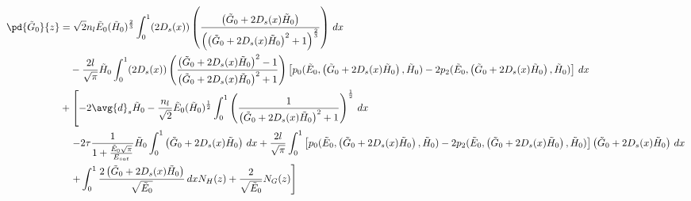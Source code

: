 \begin{equation}
\begin{split}
\pd{\tilde{G}_0}{z} &= \sqrt{2}n_{l}\tilde{E}_0 (\tilde{H}_0)^{\frac{2}{3}}  \int_{0}^{1} (2 D_s(x)) \left(\frac{\left(\tilde{G}_0+ 2 D_s(x) \tilde{H}_0\right)}{\left(\left(\tilde{G}_0+ 2 D_s(x) \tilde{H}_0\right)^2+1\right)^{\frac{2}{3}}}\right) \,dx  \\
&\quad- \frac{2l}{\sqrt{\pi}}\tilde{H}_0  \int_{0}^{1} (2 D_s(x)) \left(\frac{\left(\tilde{G}_0+ 2 D_s(x) \tilde{H}_0\right)^2-1}{\left(\tilde{G}_0+ 2 D_s(x) \tilde{H}_0\right)^2+1}\right) \left[p_0(\tilde{E}_0,\left(\tilde{G}_0 + 2 D_s(x) \tilde{H}_0\right),\tilde{H}_0) - 2p_2(\tilde{E}_0,\left(\tilde{G}_0+ 2 D_s(x) \tilde{H}_0\right),\tilde{H}_0)\right] \, dx\\
& + \left[ - 2 \avg{d}_s \tilde{H}_0 - \frac{n_{l}}{\sqrt{2}}\tilde{E}_0 (\tilde{H}_0)^{\frac{1}{2}} \int_{0}^{1} \left(\frac{1}{\left(\tilde{G}_0+ 2 D_s(x) \tilde{H}_0\right)^2+1}\right)^{\frac{1}{2}} \, dx \right.\\
&\left. \quad- 2\tau\frac{1}{1+\frac{\tilde{E}_0 \sqrt{\pi}}{E_{sat}}}\tilde{H}_0 \int_{0}^{1} \left(\tilde{G}_0+ 2 D_s(x) \tilde{H}_0\right) \,dx + \frac{2l}{\sqrt{\pi}} \int_{0}^{1}\left[p_0(\tilde{E}_0,\left(\tilde{G}_0+ 2 D_s(x) \tilde{H}_0\right),\tilde{H}_0) - 2p_2(\tilde{E}_0,\left(\tilde{G}_0+ 2 D_s(x) \tilde{H}_0\right),\tilde{H}_0)\right]\left(\tilde{G}_0+ 2 D_s(x) \tilde{H}_0\right) \, dx \right.\\
&\left. \quad+ \int_{0}^{1} \frac{2\left(\tilde{G}_0+ 2 D_s(x) \tilde{H}_0\right)}{\sqrt{\tilde{E}_0}} \,dx N_H(z) + \frac{2}{\sqrt{\tilde{E}_0}} N_G(z) \right] \\
\end{split}
\end{equation}
